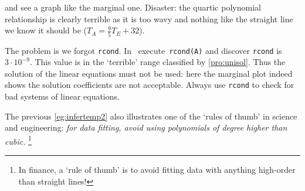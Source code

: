 \begin{example}
\begin{solution}
\begin{verbatim}
\end{verbatim}
and see a graph like the marginal one.
Disaster: the quartic polynomial relationship is clearly terrible as it is too wavy and nothing like the straight line we know it should be (\(T_A=\frac95T_E+32\)).

The problem is we forgot \verb|rcond|.
In \script\ execute~\verb|rcond(A)| and discover \verb|rcond| is \(3\cdot10^{-9}\).
This value is in the `terrible' range classified by \cref{pro:unisol}.
Thus the solution of the linear equations must not be used: here the marginal plot indeed shows the solution coefficients are not acceptable.
Always use \verb|rcond| to check for bad systems of linear equations.
\end{solution}
\end{example}

The previous \cref{eg:infertemp2} also illustrates one of the `rules of thumb' in science and engineering: \emph{for data fitting, avoid using polynomials of degree higher than cubic.}
\footnote{In finance, a `rule of thumb' is to avoid fitting data with anything high-order than straight lines!}


